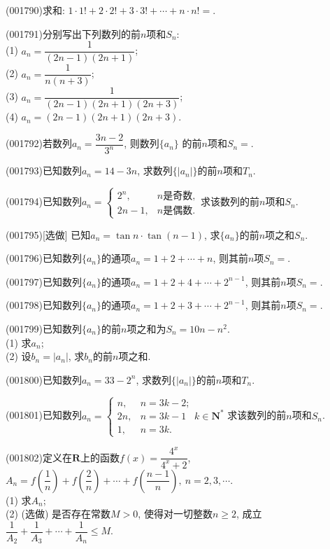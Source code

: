 \item (001790)求和: $1\cdot 1!+2\cdot 2!+3\cdot 3!+\cdots+n\cdot n!=$.
\item (001791)分别写出下列数列的前$n$项和$S_n$:\\ 
(1) $a_n=\dfrac{1}{(2n-1)(2n+1)}$;\\ 
(2) $a_n=\dfrac{1}{n(n+3)}$;\\ 
(3) $a_n=\dfrac{1}{(2n-1)(2n+1)(2n+3)}$;\\ 
(4) $a_n=(2n-1)(2n+1)(2n+3)$.
\item (001792)若数列$a_n=\dfrac{3n-2}{3^n}$, 则数列$\{a_n\}$ 的前$n$项和$S_n=$.
\item (001793)已知数列$a_n=14-3n$, 求数列$\{|a_n|\}$的前$n$项和$T_n$.
\item (001794)已知数列$a_n=\left\{\begin{array}{ll}2^n,& n\mbox{是奇数},\\2n-1,& n\mbox{是偶数}.\end{array}\right.$求该数列的前$n$项和$S_n$.
\item (001795)[选做]
已知$a_n=\tan n\cdot \tan (n-1)$, 求$\{a_n\}$的前$n$项之和$S_n$.
\item (001796)已知数列$\{a_n\}$的通项$a_n=1+2+\cdots+n$, 则其前$n$项$S_n=$.
\item (001797)已知数列$\{a_n\}$的通项$a_n=1+2+4+\cdots+2^{n-1}$, 则其前$n$项$S_n=$.
\item (001798)已知数列$\{a_n\}$的通项$a_n=1+2+3+\cdots+2^{n-1}$, 则其前$n$项$S_n=$.
\item (001799)已知数列$\{a_n\}$的前$n$项之和为$S_n=10n-n^2$.\\ 
(1) 求$a_n$;\\ 
(2) 设$b_n=|a_n|$, 求$b_n$的前$n$项之和.
\item (001800)已知数列$a_n=33-2^n$, 求数列$\{|a_n|\}$的前$n$项和$T_n$.
\item (001801)已知数列$a_n=\left\{\begin{array}{ll}n,& n=3k-2;\\2n,& n=3k-1\\1,& n=3k.\end{array}\right.k\in\mathbf{N}^*$ 求该数列的前$n$项和$S_n$.
\item (001802)定义在$\mathbf{R}$上的函数$f(x)=\dfrac{4^x}{4^x  +2}$, $A_n=f\left(\dfrac{1}{n}\right)+f\left(\dfrac{2}{n}\right)+\cdots+f\left(\dfrac{n-1}{n}\right), \ n=2,3,\cdots$.\\ 
(1) 求$A_n$;\\ 
(2) (选做) 是否存在常数$M>0$, 使得对一切整数$n\ge 2$, 成立$\dfrac{1}{A_2}+\dfrac{1}{A_3}+\cdots+\dfrac{1}{A_n}\le M$.
